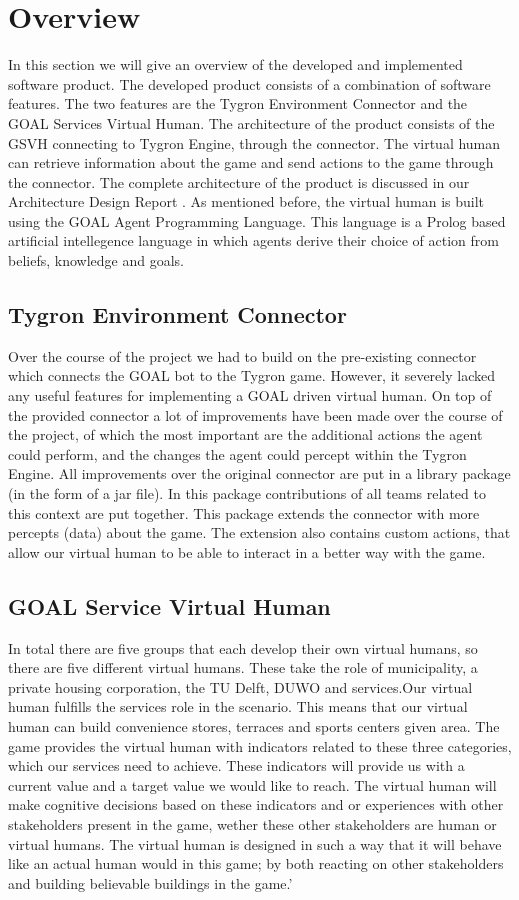\section{Overview}
In this section we will give an overview of the developed and implemented software product. The developed product consists of a combination of software features. The two features are the Tygron Environment Connector  and the GOAL Services Virtual Human. The architecture of the product consists of the GSVH connecting to Tygron Engine, through the connector. The virtual human can retrieve information about the game and send actions to the game through the connector. The complete architecture of the product is discussed in our Architecture Design Report \cite{CTD16}. As mentioned before, the virtual human is built using the GOAL Agent Programming Language\cite{GOAL16}. This language is a Prolog based artificial intellegence language in which agents derive their choice of action from beliefs, knowledge and goals.

\subsection{Tygron Environment Connector}
Over the course of the project we had to build on the pre-existing connector which connects the GOAL bot to the Tygron game. However, it severely lacked any useful features for implementing a GOAL driven virtual human. On top of the provided connector a lot of improvements have been made over the course of the project, of which the most important are the additional actions the agent could perform, and the changes the agent could percept within the Tygron Engine. All improvements over the original connector are put in a library package (in the form of a jar file). In this package contributions of all teams related to this context are put together. This package extends the connector with more percepts (data) about the game. The extension also contains custom actions, that allow our virtual human to be able to interact in a better way with the game. 

\subsection{GOAL Service Virtual Human}
In total there are five groups that each develop their own virtual humans, so there are five different virtual humans. These take the role of municipality, a private housing corporation, the TU Delft, DUWO and services.Our virtual human fulfills the services role in the scenario. This means that our virtual human can build convenience stores, terraces and sports centers given area. The game provides the virtual human with indicators related to these three categories, which our services need to achieve. These indicators will provide us with a current value and a target value we would like to reach. The virtual human will make cognitive decisions based on these indicators and or experiences with other stakeholders present in the game, wether these other stakeholders are human or virtual humans. The virtual human is designed in such a way that it will behave like an actual human would in this game; by both reacting on other stakeholders and building believable buildings in the game.'

